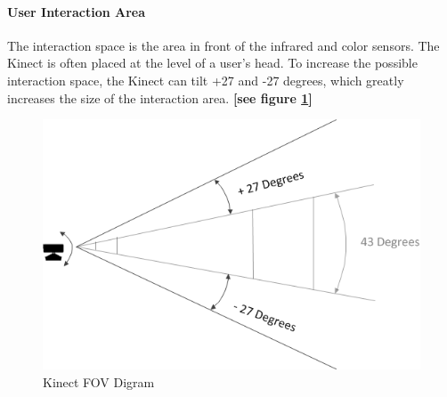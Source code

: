 \documentclass[a4paper,10pt]{article}
\begin{document}
\paragraph{User Interaction Area} 
The interaction space is the area in front of the infrared and color sensors. The Kinect is often placed at the level of a user's head.
To increase the possible interaction space, the Kinect can tilt +27 and -27 degrees, which greatly increases the size of the interaction area. \textbf{[see figure \ref{fig:kinectFov}]}
\begin{figure}[H] %
	\centerline {\includegraphics[scale = 0.75]{kinectFov.png}}
	\caption{Kinect FOV Digram}
	\label{fig:kinectFov}
	\end{figure}
\pagebreak



	
\end{document}
